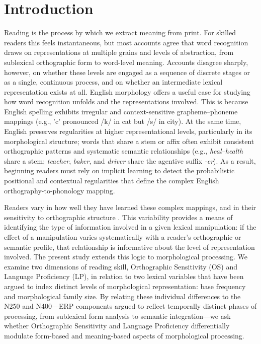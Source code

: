 \section{Introduction}

Reading is the process by which we extract meaning from print. For skilled readers this feels instantaneous, but most accounts agree that word recognition draws on representations at multiple grains and levels of abstraction, from sublexical orthographic form to word-level meaning. Accounts disagree sharply, however, on whether these levels are engaged as a sequence of discrete stages or as a single, continuous process, and on whether an intermediate lexical representation exists at all. English morphology offers a useful case for studying how word recognition unfolds and the representations involved. This is because English spelling exhibits irregular and context-sensitive grapheme–phoneme mappings (e.g., 'c' pronounced /k/ in cat but /s/ in city). At the same time, English preserves regularities at higher representational levels, particularly in its morphological structure; words that share a stem or affix often exhibit consistent orthographic patterns and systematic semantic relationships (e.g., \textit{heal--health} share a stem; \textit{teacher}, \textit{baker}, and \textit{driver} share the agentive suffix \textit{-er}). As a result, beginning readers must rely on implicit learning to detect the probabilistic positional and contextual regularities that define the complex English orthography-to-phonology mapping.

Readers vary in how well they have learned these complex mappings, and in their sensitivity to orthographic structure \citep{perfettiReadingAbilityLexical2007, castlesHowDoesOrthographic2006, stanovichExposurePrintOrthographic1989}. This variability provides a means of identifying the type of information involved in a given lexical manipulation: if the effect of a manipulation varies systematically with a reader's orthographic or semantic profile, that relationship is informative about the level of representation involved. The present study extends this logic to morphological processing. We examine two dimensions of reading skill, Orthographic Sensitivity (OS) and Language Proficiency (LP), in relation to two lexical variables that have been argued to index distinct levels of morphological representation: base frequency and morphological family size. By relating these individual differences to the N250 and N400—ERP components argued to reflect temporally distinct phases of processing, from sublexical form analysis to semantic integration—we ask whether Orthographic Sensitivity and Language Proficiency differentially modulate form-based and meaning-based aspects of morphological processing.

